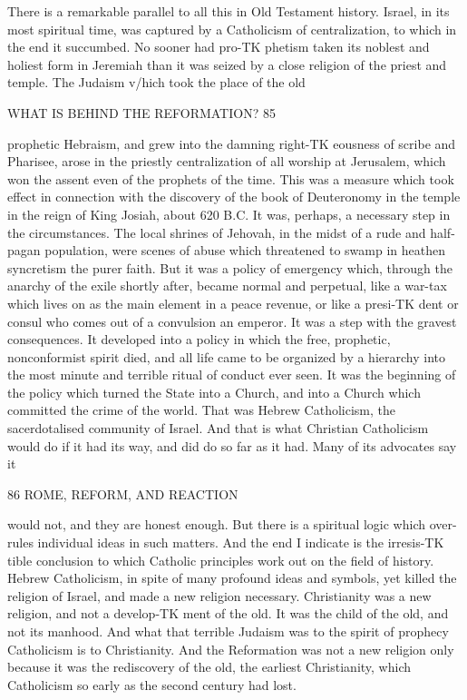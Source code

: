 \documentclass[12pt,a5paper,twoside]{book}
\begin{document}
There is a remarkable parallel to all this in Old 
Testament history. Israel, in its most spiritual time, 
was captured by a Catholicism of centralization, to 
which in the end it succumbed. No sooner had pro-TK
phetism taken its noblest and holiest form in Jeremiah 
than it was seized by a close religion of the priest and 
temple. The Judaism v/hich took the place of the old 



WHAT IS BEHIND THE REFORMATION? 85 

prophetic Hebraism, and grew into the damning right-TK
eousness of scribe and Pharisee, arose in the priestly 
centralization of all worship at Jerusalem, which won 
the assent even of the prophets of the time. This was 
a measure which took effect in connection with the 
discovery of the book of Deuteronomy in the temple 
in the reign of King Josiah, about 620 B.C. It was, 
perhaps, a necessary step in the circumstances. The 
local shrines of Jehovah, in the midst of a rude and 
half-pagan population, were scenes of abuse which 
threatened to swamp in heathen syncretism the purer 
faith. But it was a policy of emergency which, 
through the anarchy of the exile shortly after, became 
normal and perpetual, like a war-tax which lives on as 
the main element in a peace revenue, or like a presi-TK
dent or consul who comes out of a convulsion an 
emperor. It was a step with the gravest consequences. 
It developed into a policy in which the free, prophetic, 
nonconformist spirit died, and all life came to be 
organized by a hierarchy into the most minute and 
terrible ritual of conduct ever seen. It was the 
beginning of the policy which turned the State into a 
Church, and into a Church which committed the crime 
of the world. That was Hebrew Catholicism, the 
sacerdotalised community of Israel. And that is what 
Christian Catholicism would do if it had its way, and 
did do so far as it had. Many of its advocates say it 



86 ROME, REFORM, AND REACTION 

would not, and they are honest enough. But there is 
a spiritual logic which over-rules individual ideas in 
such matters. And the end I indicate is the irresis-TK
tible conclusion to which Catholic principles work out 
on the field of history. Hebrew Catholicism, in spite 
of many profound ideas and symbols, yet killed the 
religion of Israel, and made a new religion necessary. 
Christianity was a new religion, and not a develop-TK
ment of the old. It was the child of the old, and not 
its manhood. And what that terrible Judaism was to 
the spirit of prophecy Catholicism is to Christianity. 
And the Reformation was not a new religion only 
because it was the rediscovery of the old, the earliest 
Christianity, which Catholicism so early as the second 
century had lost. 
\end{document}
